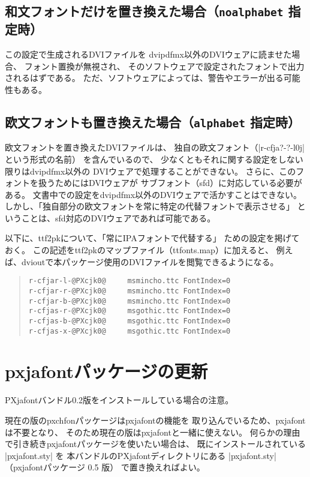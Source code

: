 \documentclass[a4paper,uplatex]{jsarticle}
\newcommand{\Pkg}[1]{\textsf{#1}}
\begin{document}
\subsection{和文フォントだけを置き換えた場合（\texttt{noalphabet} 指定時）}

この設定で生成されるDVIファイルを
dvipdfmx以外のDVIウェアに読ませた場合、
フォント置換が無視され、
そのソフトウェアで設定されたフォントで出力されるはずである。
ただ、ソフトウェアによっては、警告やエラーが出る可能性もある。

\subsection{欧文フォントも置き換えた場合（\texttt{alphabet} 指定時）}

欧文フォントを置き換えたDVIファイルは、
独自の欧文フォント（|r-cfja?-?-l0j| という形式の名前）
を含んでいるので、
少なくともそれに関する設定をしない限りはdvipdfmx以外の
DVIウェアで処理することができない。
さらに、このフォントを扱うためにはDVIウェアが
サブフォント（sfd）に対応している必要がある。
文書中での設定をdvipdfmx以外のDVIウェアで活かすことはできない。
しかし、「独自部分の欧文フォントを常に特定の代替フォントで表示させる」
ということは、sfd対応のDVIウェアであれば可能である。

以下に、ttf2pkについて、「常にIPAフォントで代替する」
ための設定を掲げておく。
この記述をttf2pkのマップファイル（ttfonts.map）に加えると、
例えば、dvioutで本パッケージ使用のDVIファイルを閲覧できるようになる。

\begin{quote}\small\begin{verbatim}
r-cfjar-l-@PXcjk0@     msmincho.ttc FontIndex=0
r-cfjar-r-@PXcjk0@     msmincho.ttc FontIndex=0
r-cfjar-b-@PXcjk0@     msmincho.ttc FontIndex=0
r-cfjas-r-@PXcjk0@     msgothic.ttc FontIndex=0
r-cfjas-b-@PXcjk0@     msgothic.ttc FontIndex=0
r-cfjas-x-@PXcjk0@     msgothic.ttc FontIndex=0
\end{verbatim}\end{quote}

\section{pxjafontパッケージの更新}

{\sffamily
\Pkg{PXjafont}バンドル0.2版をインストールしている場合の注意。}

現在の版の\Pkg{pxchfon}パッケージは\Pkg{pxjafont}の機能を
取り込んでいるため、\Pkg{pxjafont}は不要となり、
そのため現在の版は\Pkg{pxjafont}と一緒に使えない。
何らかの理由で引き続き\Pkg{pxjafont}パッケージを使いたい場合は、
既にインストールされている |pxjafont.sty| を
本バンドルの\Pkg{PXjafont}ディレクトリにある %
|pxjafont.sty|（\Pkg{pxjafont}パッケージ 0.5 版）
で置き換えればよい。
\end{document}
